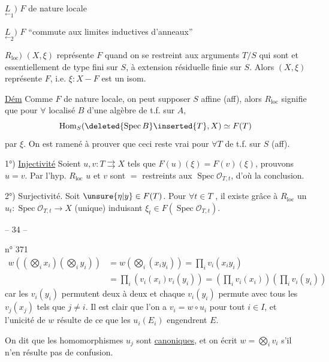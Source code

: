 $\underset{\leftarrow}{L}_1)$  $F$ de nature locale

$\underset{\leftarrow}{L}_2)$  $F$ ``commute aux limites inductives d'anneaux''

$R_{\mathrm{loc}})$  $(X,\xi)$ représente $F$ quand on se restreint aux arguments $T/S$ qui sont   et essentiellement de type fini sur $S$, à extension résiduelle finie sur $S$.
Alors $(X,\xi)$ représente $F$, i.e. $\xi:X\mathbin{-}F$ est un isom.


\uline{Dém} Comme $F$ de nature locale, on peut supposer $S$ affine (aff), alors $R_{\mathrm{loc}}$ signifie que pour $\forall$  localisé $B$ d'une algèbre de t.f. sur $A$,
\[
\operatorname{Hom}_S(\deleted{\operatorname{Spec}B}\inserted{T},X)\simeq F(T)
\]
par $\xi$.  On est ramené à prouver que ceci reste vrai pour $\forall T$ de t.f. sur $S$ (aff).

1°) \uline{Injectivité} Soient $u,v:T\rightrightarrows X$  tels que $F(u)(\xi)=F(v)(\xi)$, prouvons $u=v$. Par l'hyp. $R_{\mathrm{loc}}$ $u$ et $v$ sont $=$ restreints aux $\operatorname{Spec}\mathcal O_{T,t}$, d'où la conclusion.

2°) Surjectivité. Soit $\unsure{\eta|y}\in F(T)$. Pour $\forall t\in T$ , il existe grâce à $R_{\mathrm{loc}}$ un $u_t:\operatorname{Spec}\mathcal O_{T,t}\to X$ (unique) induisant $\xi_t\in F(\operatorname{Spec}\mathcal O_{T,t})$. 
\begin{center}-- 34 --\end{center}
\hfill n° 371
\[
\begin{aligned}
w((\bigotimes_i x_i)(\bigotimes_i y_i))&=w(\bigotimes_i(x_i y_i))=\prod_i v_i(x_i y_i)\\
&=\prod_i(v_i(x_i)v_i(y_i))=(\prod_i v_i(x_i))(\prod_i v_i(y_i))
\end{aligned}
\]
car les $v_i(y_i)$ permutent deux à deux et chaque $v_i(y_i)$ permute avec tous les $v_j(x_j)$ tels que $j\ne i$. Il est clair que l'on a $v_i=w\circ u_i$ pour tout $i\in I$, et l'unicité de $w$ résulte de ce que les $u_i(E_i)$ engendrent $E$.

On dit que les homomorphismes $u_j$ sont \uline{canoniques}, et on écrit $w=\bigotimes_i v_i$ s'il n'en résulte pas de confusion.

